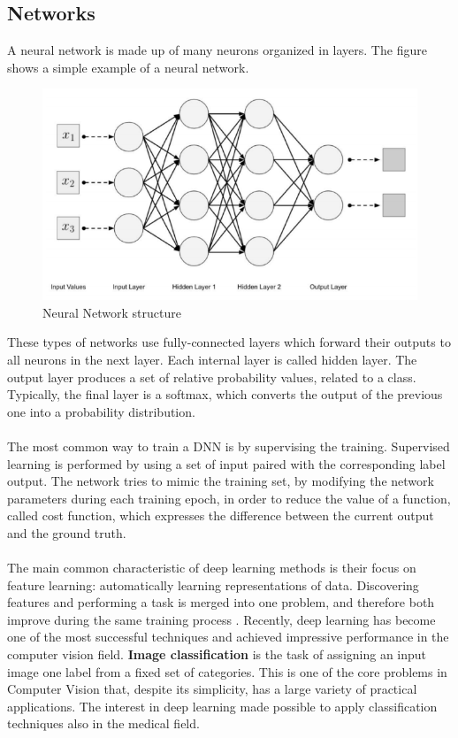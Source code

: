 \subsection{Networks}
A neural network is made up of many neurons organized in layers. The figure shows a simple example of a neural network.
\begin{figure}[ht]
    \centering
        \includegraphics[width=0.7\linewidth]{images/deepLearning/network.png}
    \caption{Neural Network structure \cite{DeepLearningApproach} }
    \label{fig:Network}
\end{figure}
These types of networks use fully-connected layers which forward their outputs to all neurons in the next layer.
Each internal layer is called hidden layer. The output layer produces a set of relative probability values, related to a class. Typically, the final layer is a softmax, which converts the output of the previous one into a probability distribution.
\\ \\
The most common way to train a DNN is by supervising the training. Supervised learning is performed by using a set of input paired with the corresponding label output.
The network tries to mimic the training set, by modifying the network parameters during each training epoch, in order to reduce the value of a function, called cost function, which expresses the difference between the current output and the ground truth.
\\\\
The main common characteristic of deep learning methods is their focus on feature learning: automatically learning representations of data. Discovering features and performing a task is merged into one problem, and therefore both improve during the same training process \cite{deepLearningMRIimaging}.
Recently, deep learning has become one of the most successful techniques and achieved impressive performance in the computer vision field.
\textbf{Image classification} is the task of assigning an input image one label from a fixed set of categories. This is one of the core problems in Computer Vision that, despite its simplicity, has a large variety of practical applications.
The interest in deep learning made possible to apply classification techniques also in the medical field.

